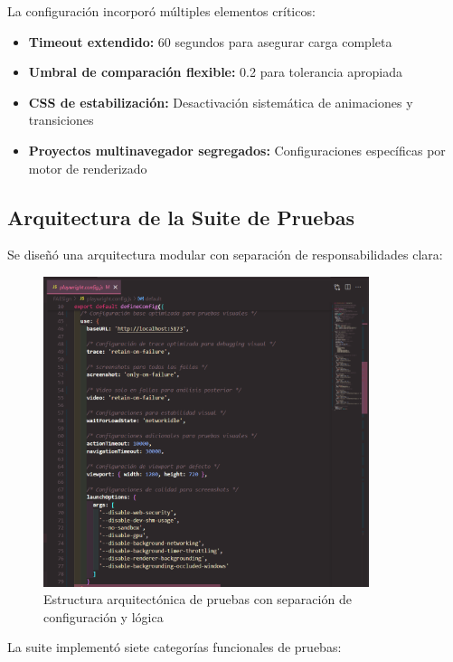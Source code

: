 \documentclass{article}
\begin{document}
La configuración incorporó múltiples elementos críticos:
\begin{itemize}[nosep]
\item \textbf{Timeout extendido:} 60 segundos para asegurar carga completa
\item \textbf{Umbral de comparación flexible:} 0.2 para tolerancia apropiada
\item \textbf{CSS de estabilización:} Desactivación sistemática de animaciones y transiciones
\item \textbf{Proyectos multinavegador segregados:} Configuraciones específicas por motor de renderizado
\end{itemize}

\subsection{Arquitectura de la Suite de Pruebas}

Se diseñó una arquitectura modular con separación de responsabilidades clara:

\begin{figure}[H]
\centering
\includegraphics[width=0.85\textwidth]{playwright/configuracionruta.png}
\caption{Estructura arquitectónica de pruebas con separación de configuración y lógica}
\label{fig:playwright-arch}
\end{figure}

La suite implementó siete categorías funcionales de pruebas:
\end{document}
